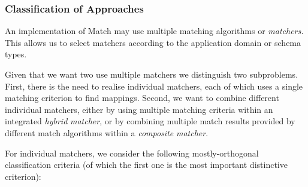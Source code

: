 \subsubsection{Classification of Approaches}
An implementation of Match may use multiple matching algorithms or
\textit{matchers. }This allows us to select matchers according to the
application domain or schema types. 

Given that we want two use multiple matchers we distinguish two
subproblems. First, there is the need to realise individual matchers,
each of which uses a single matching criterion to find mappings.
Second, we want to combine different individual matchers, either by
using multiple matching criteria within an integrated \textit{hybrid}
\textit{matcher}, or by combining multiple match results provided by
different match algorithms within a \textit{composite}
\textit{matcher}. 

For individual matchers, we consider the following mostly-orthogonal
classification criteria (of which the first one is the most important
distinctive criterion): 

